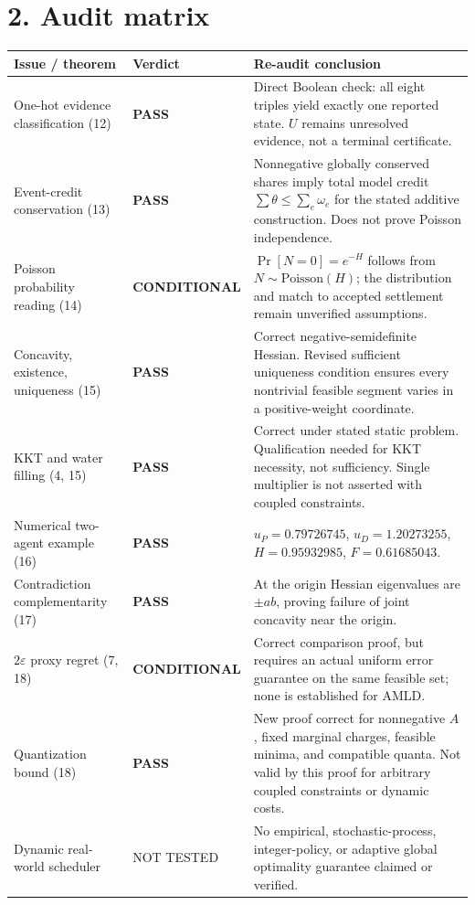 \documentclass[10pt,letterpaper]{article}
\newcommand{\pass}{\textbf{PASS}}
\newcommand{\partialpass}{\textbf{CONDITIONAL}}
\begin{document}
\section*{2. Audit matrix}
\small
\begin{tabular}{@{}p{.34\linewidth}p{.18\linewidth}p{.42\linewidth}@{}}
\toprule
Issue / theorem & Verdict & Re-audit conclusion \\
\midrule
One-hot evidence classification (12) & \pass & Direct Boolean check: all eight triples yield exactly one reported state. $U$ remains unresolved evidence, not a terminal certificate. \\
Event-credit conservation (13) & \pass & Nonnegative globally conserved shares imply total model credit $\sum\theta\le\sum_e\omega_e$ for the stated additive construction. Does not prove Poisson independence. \\
Poisson probability reading (14) & \partialpass & $\Pr[N=0]=e^{-H}$ follows from $N\sim\mathrm{Poisson}(H)$; the distribution and match to accepted settlement remain unverified assumptions. \\
Concavity, existence, uniqueness (15) & \pass & Correct negative-semidefinite Hessian. Revised sufficient uniqueness condition ensures every nontrivial feasible segment varies in a positive-weight coordinate. \\
KKT and water filling (4, 15) & \pass & Correct under stated static problem. Qualification needed for KKT necessity, not sufficiency. Single multiplier is not asserted with coupled constraints. \\
Numerical two-agent example (16) & \pass & $u_P=0.79726745$, $u_D=1.20273255$, $H=0.95932985$, $F=0.61685043$. \\
Contradiction complementarity (17) & \pass & At the origin Hessian eigenvalues are $\pm ab$, proving failure of joint concavity near the origin. \\
$2\varepsilon$ proxy regret (7, 18) & \partialpass & Correct comparison proof, but requires an actual uniform error guarantee on the same feasible set; none is established for AMLD. \\
Quantization bound (18) & \pass & New proof correct for nonnegative $A$, fixed marginal charges, feasible minima, and compatible quanta. Not valid by this proof for arbitrary coupled constraints or dynamic costs. \\
Dynamic real-world scheduler & NOT TESTED & No empirical, stochastic-process, integer-policy, or adaptive global optimality guarantee claimed or verified. \\
\bottomrule
\end{tabular}
\normalsize
\end{document}
